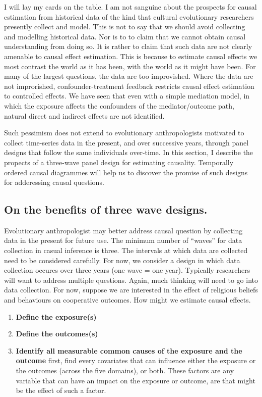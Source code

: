 \documentclass[
  singlecolumn]{report}
\begin{document}
I will lay my cards on the table. I am not sanguine about the prospects
for causal estimation from historical data of the kind that cultural
evolutionary researchers presently collect and model. This is not to say
that we should avoid collecting and modelling historical data. Nor is to
to claim that we cannot obtain causal understanding from doing so. It is
rather to claim that such data are not clearly amenable to causal effect
estimation. This is because to estimate causal effects we most contrast
the world as it has been, with the world as it might have been. For many
of the largest questions, the data are too improvished. Where the data
are not improrished, confounder-treatment feedback restricts causal
effect estimation to controlled effects. We have seen that even with a
simple mediation model, in which the exposure affects the confounders of
the mediator/outcome path, natural direct and indirect effects are not
identified.

Such pessimism does not extend to evolutionary anthropologists motivated
to collect time-series data in the present, and over successive years,
through panel designs that follow the same individuals over-time. In
this section, I describe the propects of a three-wave panel design for
estimating causality. Temporally ordered causal diagrammes will help us
to discover the promise of such designs for adderessing causal
questions.

\hypertarget{on-the-benefits-of-three-wave-designs.}{%
\subsection{On the benefits of three wave
designs.}\label{on-the-benefits-of-three-wave-designs.}}

Evolutionary anthropologist may better address causal question by
collecting data in the present for future use. The minimum number of
``waves'' for data collection in casual inference is three. The
intervals at which data are collected need to be considered carefully.
For now, we consider a design in which data collection occures over
three years (one wave = one year). Typically researchers will want to
address multiple questions. Again, much thinking will need to go into
data collection. For now, suppose we are interested in the effect of
religious beliefs and behaviours on cooperative outcomes. How might we
estimate causal effects.

\begin{enumerate}
\def\labelenumi{\arabic{enumi}.}
\item
  \textbf{Define the exposure(s)}
\item
  \textbf{Define the outcomes(s)}
\item
  \textbf{Identify all measurable common causes of the exposure and the
  outcome} first, find every covariates that can influence either the
  exposure or the outcomes (across the five domains), or both. These
  factors are any variable that can have an impact on the exposure or
  outcome, are that might be the effect of such a factor.
\end{enumerate}
\end{document}
